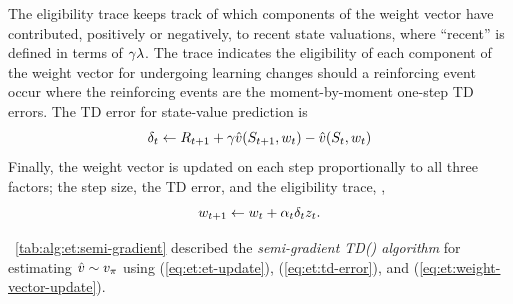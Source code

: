 The eligibility trace keeps track of which components of the weight vector have contributed, positively or negatively,
to recent state valuations,
where ``recent'' is defined in terms of $\gamma \lambda$.
The trace indicates the eligibility of each component of the weight vector for undergoing learning changes
should a reinforcing event occur where
the reinforcing events are the moment-by-moment one-step TD errors.
The TD error for state-value prediction is
\begin{equation}
\label{eq:et:td-error}
\delta_{t} \leftarrow R_{t+1} + \gamma \hat{v}(S_{t+1}, {w_{t}}) - \hat{v}(S_{t}, {w_{t}})
\end{equation}
Finally, the weight vector is updated on each step
proportionally to all three factors;
the step size,
the TD error,
and the eligibility trace,
\ie,
\begin{equation}
\label{eq:et:weight-vector-update}
{w_{t+1}} \leftarrow {w_{t}} + \alpha_{t} \delta_{t} z_{t}.
\end{equation}

\tablename~\ref{tab:alg:et:semi-gradient} described the \emph{semi-gradient TD(\tdparam) algorithm} for estimating $\hat{v} \sim v_{\pi}$
using
(\ref{eq:et:et-update}),
(\ref{eq:et:td-error}),
and
(\ref{eq:et:weight-vector-update}).

